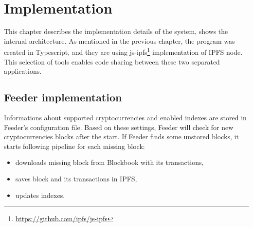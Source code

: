 \chapter{Implementation}
\label{Implementation}
This chapter describes the implementation details of the system, shows the internal
architecture. As mentioned in the previous chapter, the program was created in Typescript, and they are using js-ipfs\footnote{\url{https://github.com/ipfs/js-ipfs}} implementation of IPFS node. This selection of tools enables code sharing between these two separated applications.

\section{Feeder implementation}
Informations about supported cryptocurrencies and enabled indexes are stored in Feeder's configuration file. Based on these settings, Feeder will check for new cryptocurrencies blocks after the start. If Feeder finds some unstored blocks, it starts following pipeline for each missing block:
\begin{itemize}
    \item downloads missing block from Blockbook with its transactions,
    \item saves block and its transactions in IPFS,
    \item updates indexes.
\end{itemize}


